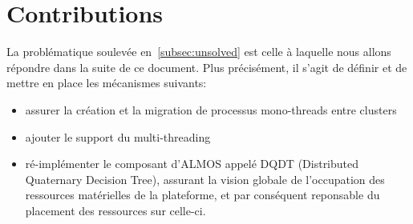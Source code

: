       
  \section{Contributions}

    La problématique soulevée en~\ref{subsec:unsolved} est celle à laquelle nous
    allons répondre dans la suite de ce document. Plus précisément, il s'agit de
    définir et de mettre en place les mécanismes suivants:
    
    \begin{itemize}
      \item assurer la création et la migration de processus mono-threads entre
        clusters
      \item ajouter le support du multi-threading
      \item ré-implémenter le composant d'ALMOS appelé DQDT (Distributed
        Quaternary Decision Tree), assurant la vision globale de l'occupation
        des ressources matérielles de la plateforme, et par conséquent
        reponsable du placement des ressources sur celle-ci.
    \end{itemize}

    

